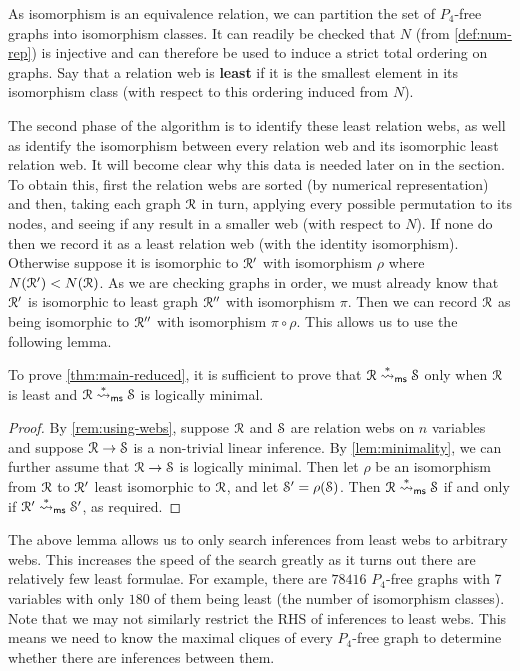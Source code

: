 \documentclass[a4paper, UKenglish, cleveref]{lipics-v2019}
\begin{document}
As isomorphism is an equivalence relation, we can partition the set of \(P_4\)-free graphs into isomorphism classes. It can readily be checked that \(N\) (from \cref{def:num-rep}) is injective and can therefore be used to induce a strict total ordering on graphs. Say that a relation web is \textbf{least} if it is the smallest element in its isomorphism class (with respect to this ordering induced from \(N\)).

The second phase of the algorithm is to identify these least relation webs, as well as identify the isomorphism between every relation web and its isomorphic least relation web. It will become clear why this data is needed later on in the section. To obtain this, first the relation webs are sorted (by numerical representation) and then, taking each graph \(\R\) in turn, applying every possible permutation to its nodes, and seeing if any result in a smaller web (with respect to $N$). If none do then we record it as a least relation web (with the identity isomorphism). Otherwise suppose it is isomorphic to \(\R'\) with isomorphism \(\rho\) where \(N(\R') < N(\R)\). As we are checking graphs in order, we must already know that \(\R'\) is isomorphic to least graph \(\R''\) with isomorphism \(\pi\). Then we can record \(\R\) as being isomorphic to \(\R''\) with isomorphism \(\pi \circ \rho\). This allows us to use the following lemma.

\begin{lemma}
  \label{lem:least}
  To prove \cref{thm:main-reduced}, it is sufficient to prove that \(\R \redms \S\) only when \(\R\) is least and \(\R \redms \S\) is logically minimal.
\end{lemma}
\begin{proof}
  By \cref{rem:using-webs}, suppose \(\R\) and \(\S\) are relation webs on \(n\) variables and suppose \(\R \to \S\) is a non-trivial linear inference. By \cref{lem:minimality}, we can further assume that \(\R \to \S\) is logically minimal. Then let \(\rho \) be an isomorphism from $\R$ to \(\R'\) least isomorphic to $\R$, and let \(\S' = \rho(\S)\). Then \(\R \redms \S\) if and only if \(\R' \redms \S'\), as required.
\end{proof}

The above lemma allows us to only search inferences from least webs to arbitrary webs. This increases the speed of the search greatly as it turns out there are relatively few least formulae. For example, there are \(78416\) \(P_4\)-free graphs with 7 variables with only \(180\) of them being least (the number of isomorphism classes). Note that we may not similarly restrict the RHS of inferences to least webs. This means we need to know the maximal cliques of every \(P_4\)-free graph to determine whether there are inferences between them.
\end{document}
